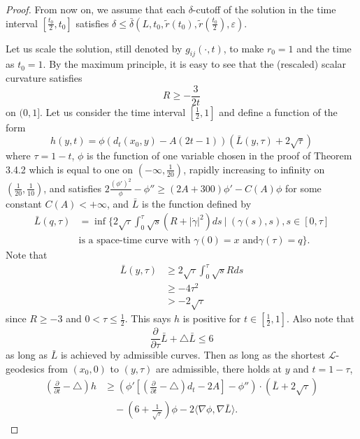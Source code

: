 \begin{proof}
{}From now on, we assume that each $\delta$-cutoff of the solution
in the time interval $[\frac{t_0}{2},t_0]$ satisfies $\delta \leq
\bar{\delta}(L,t_0,\widetilde{r}(t_0),
\widetilde{r}(\frac{t_0}{2}),\varepsilon).$

Let us scale the solution, still denoted by $g_{ij}(\cdot,t)$, to
make $r_0=1$ and the time as $t_0=1$. By the maximum principle, it
is easy to see that the (rescaled) scalar curvature satisfies
$$
R \geq -\frac{3}{2t}
$$
on $(0,1]$. Let us consider the time interval $[\frac{1}{2},1]$
and define a function of the form
$$
h(y,t)=\phi(d_t(x_0,y)-A(2t-1))(\bar{L}(y,\tau)+2\sqrt{\tau})
$$
where $\tau=1-t$, $\phi$ is the function of one variable chosen in
the proof of Theorem 3.4.2 which is equal to one on
$(-\infty,\frac{1}{20})$, rapidly increasing to infinity on
$(\frac{1}{20},\frac{1}{10})$, and satisfies
$2\frac{(\phi')^2}{\phi}-\phi''\geq(2A+300)\phi'-C(A)\phi$ for
some constant $C(A)<+\infty$, and $\bar{L}$ is the function
defined by
\begin{align*}
\bar{L}(q,\tau) &=\inf\Big\{2\sqrt{\tau}\int^{\tau}_0\sqrt{s}
(R+|\dot{\gamma}|^2)ds\ |\ (\gamma(s),s),
s\in[0,\tau]\\
&\text{is a space-time curve with $\gamma(0)=x$ and
$\gamma(\tau)=q$}\Big\}.
\end{align*}
Note that
\begin{align}
\bar{L}(y,\tau)
& \geq 2\sqrt{\tau}\int^{\tau}_0\sqrt{s}Rds\\
& \geq -4\tau^2 \nonumber\\
&  >   -2\sqrt{\tau} \nonumber%
\end{align}
since $R\geq -3$ and $0<\tau\leq \frac{1}{2}$. This says $h$ is
positive for $t\in[\frac{1}{2},1]$. Also note that \begin{equation}
\frac{\partial}{\partial \tau}\bar{L}+\triangle \bar{L}\leq 6
\end{equation} as long as $\bar{L}$ is achieved by admissible curves. Then as
long as the shortest $\mathcal{L}$-geodesics from $(x_0,0)$ to
$(y,\tau)$ are admissible, there holds at $y$ and $t=1-\tau$,
\begin{align*}
\left(\frac{\partial}{\partial t}-\triangle\right)h &\geq
\left(\phi'\left[\left(\frac{\partial}{\partial t}
-\triangle\right)d_t-2A\right]-\phi''\right)\cdot(\bar{L}+2\sqrt{\tau})\\
&\quad-\left(6+\frac{1}{\sqrt{\tau}}\right)\phi-2\langle\nabla
\phi,\nabla\bar{L}\rangle.
\end{align*}


\end{proof}
